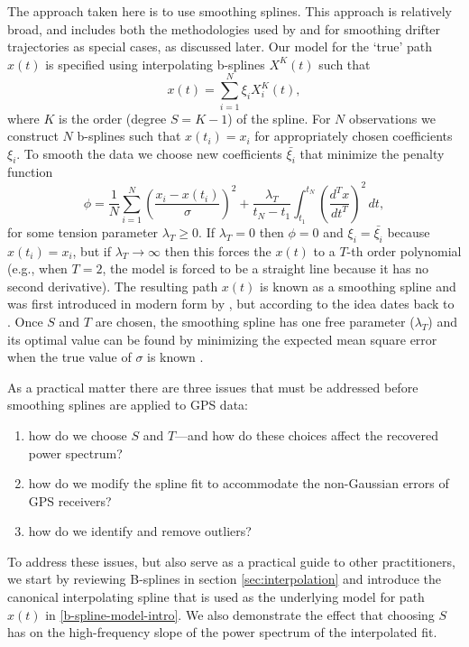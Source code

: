 \documentclass{ametsoc}
\begin{document}
The approach taken here is to use smoothing splines. This approach is relatively broad, and includes both the methodologies used by \citet{yaremchuk2015-joe} and \citet{elipot2016-jgr} for smoothing drifter trajectories as special cases, as discussed later.  Our model for the `true' path $x(t)$ is specified using interpolating b-splines $X^K(t)$ such that
\begin{equation}
\label{b-spline-model-intro}
    x(t) = \sum_{i=1}^N \xi_i X^K_i(t),
\end{equation}
where $K$ is the order (degree $S=K-1$) of the spline. For $N$ observations we construct $N$ b-splines such that $x(t_i)=x_i$ for appropriately chosen coefficients $\xi_i$. To smooth the data we choose new coefficients $\bar{\xi_i}$ that minimize the penalty function
\begin{equation}
\label{smoothing-spline}
\phi =  \frac{1}{N}\sum_{i=1}^{N} \left( \frac{x_i - x(t_i)}{\sigma} \right) ^2 + \frac{\lambda_T}{t_N-t_1} \int_{t_1}^{t_N} \left(\frac{d^T x}{dt^T}\right)^2 \, dt,
\end{equation}
for some tension parameter $\lambda_T \geq 0$. If $\lambda_T = 0$ then $\phi=0$ and $\xi_i=\bar{\xi_i}$ because $x(t_i)=x_i$, but if $\lambda_T \rightarrow \infty$ then this forces the $x(t)$ to a $T$-th order polynomial (e.g., when $T=2$, the model is forced to be a straight line because it has no second derivative). The resulting path $x(t)$ is known as a smoothing spline and was first introduced in modern form by \citet{reinsch1967-nm}, but according to \citet{deboor1978-book} the idea dates back to \citet{whittaker1923-pems}. Once $S$ and $T$ are chosen, the smoothing spline has one free parameter ($\lambda_T$) and its optimal value can be found by minimizing the expected mean square error when the true value of $\sigma$ is known \citep{craven1979-nm}.

As a practical matter there are three issues that must be addressed before smoothing splines are applied to GPS data:
\begin{enumerate}
    \item how do we choose $S$ and $T$---and how do these choices affect the recovered power spectrum?
    \item how do we modify the spline fit to accommodate the non-Gaussian errors of GPS receivers?
    \item how do we identify and remove outliers?
\end{enumerate}
To address these issues, but also serve as a practical guide to other practitioners, we start by reviewing B-splines in section \ref{sec:interpolation} and introduce the canonical interpolating spline that is used as the underlying model for path $x(t)$ in \eqref{b-spline-model-intro}. We also demonstrate the effect that choosing $S$ has on the high-frequency slope of the power spectrum of the interpolated fit.
\end{document}

